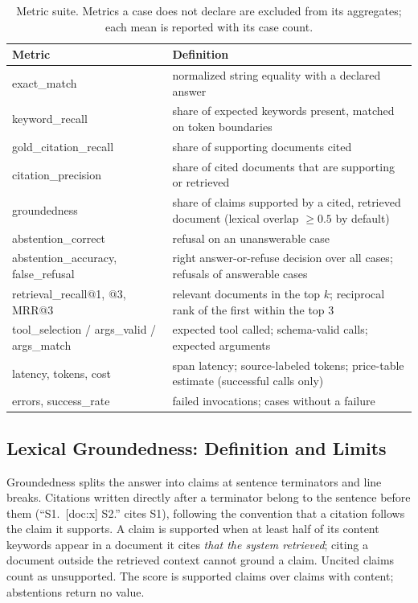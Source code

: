 \documentclass[conference]{IEEEtran}
\begin{document}
\begin{table}[t]
\centering
\caption{Metric suite. Metrics a case does not declare are excluded from
its aggregates; each mean is reported with its case count.}
\label{tab:metrics}
\small
\begin{tabular}{@{}>{\raggedright\arraybackslash}p{}>{\raggedright\arraybackslash}p{}@{}}
\toprule
Metric & Definition \\
\midrule
exact\_match & normalized string equality with a declared answer \\
keyword\_recall & share of expected keywords present, matched on token
boundaries \\
gold\_citation\_recall & share of supporting documents cited \\
citation\_precision & share of cited documents that are supporting or
retrieved \\
groundedness & share of claims supported by a cited, retrieved document
(lexical overlap $\ge 0.5$ by default) \\
abstention\_correct & refusal on an unanswerable case \\
abstention\_accuracy, false\_refusal & right answer-or-refuse decision over
all cases; refusals of answerable cases \\
retrieval\_recall@1, @3, MRR@3 & relevant documents in the top $k$;
reciprocal rank of the first within the top 3 \\
tool\_selection / args\_valid / args\_match & expected tool called;
schema-valid calls; expected arguments \\
latency, tokens, cost & span latency; source-labeled tokens; price-table
estimate (successful calls only) \\
errors, success\_rate & failed invocations; cases without a failure \\
\bottomrule
\end{tabular}
\end{table}

\subsection{Lexical Groundedness: Definition and Limits}
Groundedness splits the answer into claims at sentence terminators and line
breaks. Citations written directly after a terminator belong to the
sentence before them (``S1.\ [doc:x] S2.'' cites S1), following the
convention that a citation follows the claim it supports. A claim is
supported when at least half of its content keywords appear in a document
it cites \emph{that the system retrieved}; citing a document outside the
retrieved context cannot ground a claim. Uncited claims count as
unsupported. The score is supported claims over claims with content;
abstentions return no value.
\end{document}
